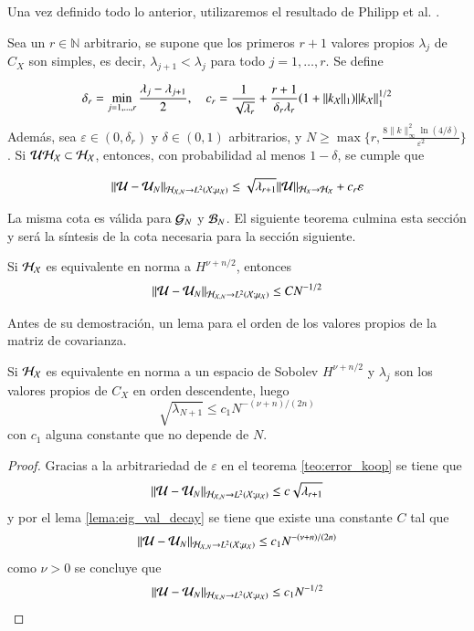 	Una vez definido todo lo anterior, utilizaremos el resultado de Philipp et al. \cite{Philipp2024ErrorOperator}.
	\begin{teo}
		Sea un \( r \in \mathbb{N} \) arbitrario, se supone que los primeros \( r + 1 \) valores propios \( \lambda_j \) de \( C_X \) son simples, es decir, \( \lambda_{j+1} < \lambda_j \) para todo \( j = 1, \ldots, r \). Se define
		
		\[
		\delta_r = \min_{j=1, \ldots, r} \frac{\lambda_j - \lambda_{j+1}}{2}, \quad c_r = \frac{1}{\sqrt{\lambda_r}} + \frac{r + 1}{\delta_r \lambda_r} (1 + \|k_{\mathcal{X}}\|_{1}) \|k_{\mathcal{X}} \|^{1/2}_{1}
		\]
		Además, sea \( \varepsilon \in (0, \delta_r) \) y \( \delta \in (0, 1) \) arbitrarios, y \( N \geq \max\{r, \frac{8\|k\|^2_\infty \ln(4/\delta)}{\varepsilon^2}\} \). Si $\mathcal{U} \mathcal{H}_{\mathcal{X}} \subset \mathcal{H}_{\mathcal{X}}$, entonces, con probabilidad al menos \( 1 - \delta \), se cumple que
		
		\[
		\|\mathcal{U} - \mathcal{U}_N \|_{\mathcal{H}_{\mathcal{X}, N} \to L^2(\mathcal{X}; \mu_{\mathcal{X}})} \leq \sqrt{\lambda_{r+1}} \|\mathcal{U} \|_{\mathcal{H}_{X} \to \mathcal{H_{\mathcal{X}}}} + c_r \varepsilon
		\]
		\label{teo:error_koop}
	\end{teo}
	La misma cota es válida para $\mathcal{G}_N$ y $\mathcal{B}_N$. El siguiente teorema culmina esta sección y será la síntesis de la cota necesaria para la sección siguiente.
\begin{teo}
    Si $\mathcal{H}_{\mathcal{X}}$ es equivalente en norma a $H^{\nu + n/2}$, entonces 
    \begin{equation}
        \| \mathcal{U} - \mathcal{U}_N \|_{\mathcal{H}_{\mathcal{X}, N} \to L^2(\mathcal{X}; \mu_{\mathcal{X}})} \leq C N^{-1/2}  
        \label{eq:kEDMD_bound}
    \end{equation}
	\label{teo:error_koop_sqrt_N}
    \end{teo}
Antes de su demostración, un lema para el orden de los valores propios de la matriz de covarianza.
	\begin{teo}
		Si $\mathcal{H}_{\mathcal{X}}$ es equivalente en norma a un espacio de Sobolev $H^{\nu + n/2}$ y $\lambda_j$ son los valores propios de $C_X$ en orden descendente, luego
	\begin{equation*}
		\sqrt{\lambda_{N+1}} \leq c_1 N^{-(\nu + n)/(2n)}
	\end{equation*}
	con $c_1$ alguna constante que no depende de $N$.
	\label{lema:eig_val_decay}
	\end{teo}
	\begin{proof}
		Gracias a la arbitrariedad de $\varepsilon$ en el teorema \ref{teo:error_koop} se tiene que
		\[
		\|\mathcal{U} - \mathcal{U}_N \|_{\mathcal{H}_{\mathcal{X}, N} \to L^2(\mathcal{X}; \mu_{\mathcal{X}})} \leq c\sqrt{\lambda_{r+1}} 
		\]
		y por el lema \ref{lema:eig_val_decay} se tiene que existe una constante $C$ tal que
		\begin{equation*}
			\|\mathcal{U} - \mathcal{U}_N \|_{\mathcal{H}_{\mathcal{X}, N} \to L^2(\mathcal{X}; \mu_{\mathcal{X}})} \leq c_1 N^{-(\nu + n)/(2n)}
		\end{equation*}
		como $\nu > 0$ se concluye que
		\begin{equation*}
			\|\mathcal{U} - \mathcal{U}_N \|_{\mathcal{H}_{\mathcal{X}, N} \to L^2(\mathcal{X}; \mu_{\mathcal{X}})} \leq c_1 N^{-1/2}\\
		\end{equation*}
	\end{proof}
